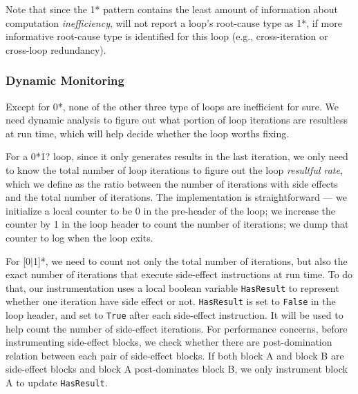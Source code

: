 Note that since the 1* pattern contains the least amount of information
about computation \textit{inefficiency}, \Tool will not report a loop's
root-cause type as 1*, if more informative root-cause type is identified 
for this loop (e.g., cross-iteration or cross-loop redundancy).

\subsubsection{Dynamic Monitoring}
\label{sec:d_workless}

Except for 0*, none of the other three type of loops are inefficient for sure.
We need dynamic analysis to figure out what portion of loop iterations are
resultless at run time, which will help decide whether the loop worths fixing.

For a 0*1? loop, since it only generates results in the last iteration, we 
only need to know the total number of loop iterations 
to figure out the loop
\textit{resultful rate}, which we define as the ratio between
the number of iterations with
side effects and the total number of iterations. 
The implementation is straightforward
--- we initialize a local counter to be 0 in the pre-header of the loop; we 
increase the counter by 1 in the loop header to count the number of 
iterations; we dump that counter to log when the loop exits.

For [0$|$1]*, we need to count not only the total number of iterations, but
also the exact number of iterations that execute side-effect instructions
at run time. 
To do that, our instrumentation uses a local boolean variable 
\texttt{HasResult} to represent whether one iteration have side effect or not. 
\texttt{HasResult} is set to \texttt{False} in the loop header, and set to
\texttt{True} after each side-effect instruction. It will be used to help
count the number of side-effect iterations. For performance concerns,
before instrumenting side-effect blocks, we check whether there are 
post-domination relation between each pair of side-effect blocks. 
If both block A and block B are side-effect blocks and block A post-dominates 
block B, we only instrument block A to update \texttt{HasResult}. 


